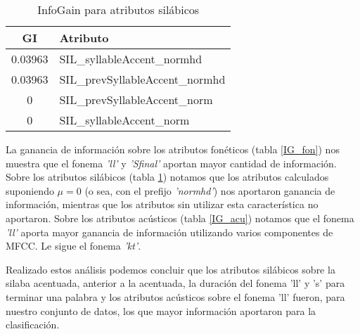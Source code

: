   	\begin{table}[H]
  		\centering
  		\begin{tabular}{cl}
  			\hline
  			\textbf{GI} & \textbf{Atributo} \\ \hline
  			0.03963 & SIL\_syllableAccent\_normhd \\
  			0.03963 & SIL\_prevSyllableAccent\_normhd \\
  			0       & SIL\_prevSyllableAccent\_norm \\
  			0       & SIL\_syllableAccent\_norm \\
  			\hline
  		\end{tabular}
  		\caption{InfoGain para atributos silábicos} 
  		\label{IG_sil}
  	\end{table}
  	
La ganancia de información sobre los atributos fonéticos (tabla \ref{IG_fon}) nos muestra que el fonema \textit{'ll'} y \textit{'Sfinal'} aportan mayor cantidad de información. Sobre los atributos silábicos (tabla \ref{IG_sil}) notamos que los atributos calculados suponiendo $\mu = 0$ (o sea, con el prefijo \textit{'normhd'}) nos aportaron ganancia de información, mientras que los atributos sin utilizar esta característica no aportaron. Sobre los atributos acústicos (tabla \ref{IG_acu}) notamos que el fonema \textit{'ll'} aporta mayor ganancia de información utilizando varios componentes de MFCC. Le sigue el fonema \textit{'kt'}. 

Realizado estos análisis podemos concluir que los atributos silábicos sobre la silaba acentuada, anterior a la acentuada, la duración del fonema 'll' y 's' para terminar una palabra y los atributos acústicos sobre el fonema 'll' fueron, para nuestro conjunto de datos, los que mayor información aportaron para la clasificación.



